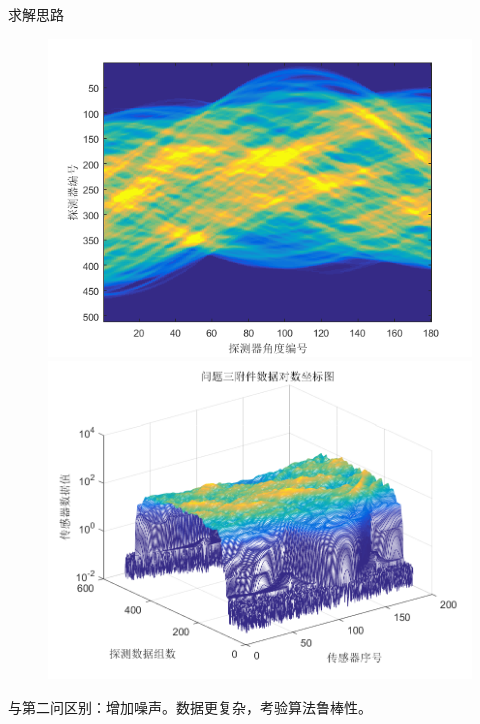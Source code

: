\documentclass[serif]{beamer} %
\begin{document}
\begin{frame}{求解思路}
   \begin{figure}[H]
		\begin{minipage}[H]{0.45\textwidth}
		\centering
		\includegraphics[width=\textwidth]{./pic/fujian5_2.png}
		\end{minipage}
		\begin{minipage}[H]{0.5\textwidth}
		\centering
		\includegraphics[width=\textwidth]{./pic/fujian5.png}
		\end{minipage}
	\end{figure}
	与第二问区别：增加噪声。数据更复杂，考验算法鲁棒性。
\end{frame}
  
\end{document}
